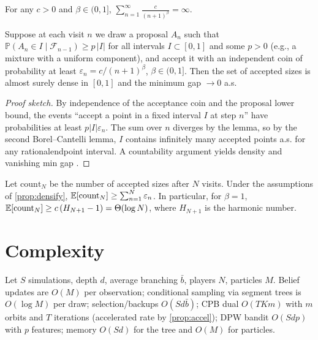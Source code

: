 \begin{lemma}
For any $c>0$ and $\beta\in(0,1]$, $\sum_{n=1}^{\infty} \frac{c}{(n+1)^\beta}=\infty$.
\end{lemma}

\begin{proposition}\label{prop:densify}
Suppose at each visit $n$ we draw a proposal $A_n$ such that $\mathbb{P}(A_n\in I\mid \mathcal{F}_{n-1})\ge p\,|I|$ for all intervals $I\subset[0,1]$ and some $p>0$ (e.g., a mixture with a uniform component), and accept it with an independent coin of probability at least $\varepsilon_n=c/(n+1)^\beta$, $\beta\in(0,1]$. Then the set of accepted sizes is almost surely dense in $[0,1]$ and the minimum gap $\to 0$ a.s.
\end{proposition}
\begin{proof}[Proof sketch]
By independence of the acceptance coin and the proposal lower bound, the events “accept a point in a fixed interval $I$ at step $n$” have probabilities at least $p|I|\varepsilon_n$. The sum over $n$ diverges by the lemma, so by the second Borel–Cantelli lemma, $I$ contains infinitely many accepted points a.s. for any rational\textendash endpoint interval. A countability argument yields density and vanishing min gap \cite{durrett2019probability}.
\end{proof}

\begin{corollary}\label{cor:expect}
Let $\mathrm{count}_N$ be the number of accepted sizes after $N$ visits. Under the assumptions of \cref{prop:densify}, $\mathbb{E}[\mathrm{count}_N]\ge \sum_{n=1}^{N}\varepsilon_n$. In particular, for $\beta=1$, $\mathbb{E}[\mathrm{count}_N]\ge c\,(H_{N+1}-1)=\Theta(\log N)$, where $H_{N+1}$ is the harmonic number.
\end{corollary}

\section{Complexity}
Let $S$ simulations, depth $d$, average branching $\bar b$, players $N$, particles $M$. Belief updates are $O(M)$ per observation; conditional sampling via segment trees is $O(\log M)$ per draw; selection/backups $O(S d \bar b)$; CPB dual $O(T K m)$ with $m$ orbits and $T$ iterations (accelerated rate by \cref{prop:accel}); DPW bandit $O(S d p)$ with $p$ features; memory $O(Sd)$ for the tree and $O(M)$ for particles.

